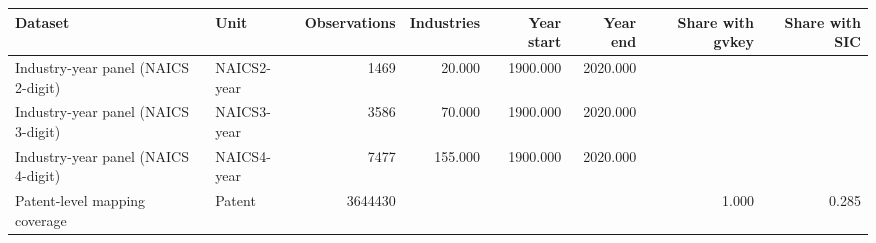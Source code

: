 \begin{tabular}{llrrrrrr}
\toprule
Dataset & Unit & Observations & Industries & Year start & Year end & Share with gvkey & Share with SIC \\
\midrule
Industry-year panel (NAICS 2-digit) & NAICS2-year & 1469 & 20.000 & 1900.000 & 2020.000 &  &  \\
Industry-year panel (NAICS 3-digit) & NAICS3-year & 3586 & 70.000 & 1900.000 & 2020.000 &  &  \\
Industry-year panel (NAICS 4-digit) & NAICS4-year & 7477 & 155.000 & 1900.000 & 2020.000 &  &  \\
Patent-level mapping coverage & Patent & 3644430 &  &  &  & 1.000 & 0.285 \\
\bottomrule
\end{tabular}
